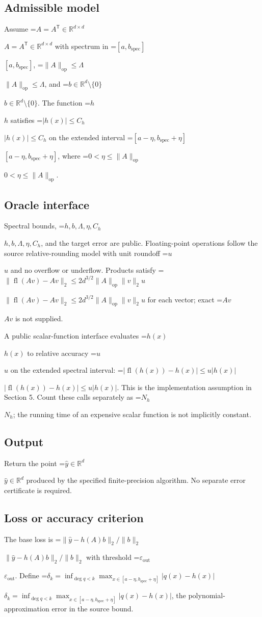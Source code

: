 \documentclass[10pt,a4paper]{article}
\newcommand{\AtlasMath}[1]{\par\begingroup\centering\setbox0=\hbox{$\displaystyle #1$}\ifdim\wd0>1.4\linewidth\typeout{ATLAS WIDE FORMULA: \the\wd0}\fi\ifdim\wd0>\linewidth\resizebox{\linewidth}{!}{\box0}\else\box0\fi\par\endgroup}
\newcommand{\AtlasInlineMath}[1]{\begingroup\setbox0=\hbox{$#1$}\ifdim\wd0>.4\linewidth\endgroup\AtlasMath{#1}\else\endgroup$#1$\fi}
\begin{document}
\subsection{Admissible model}
Assume \AtlasInlineMath{A=A^{\mathsf T}\in\mathbb{R}^{d\times d}} with spectrum in \AtlasInlineMath{[a,b_{\mathrm{spec}}]}, \AtlasInlineMath{\|A\|_{\mathrm{op}}\le\Lambda}, and \AtlasInlineMath{b\in\mathbb{R}^d\setminus\{0\}}. The function \AtlasInlineMath{h} satisfies \AtlasInlineMath{|h(x)|\le C_h} on the extended interval \AtlasInlineMath{[a-\eta,b_{\mathrm{spec}}+\eta]}, where \AtlasInlineMath{0<\eta\le\|A\|_{\mathrm{op}}}.

\subsection{Oracle interface}
Spectral bounds, \AtlasInlineMath{h,b,\Lambda,\eta,C_h}, and the target error are public. Floating-point operations follow the source relative-rounding model with unit roundoff \AtlasInlineMath{u} and no overflow or underflow. Products satisfy \AtlasInlineMath{\|\operatorname{fl}(Av)-Av\|_2\le2d^{3/2}\|A\|_{\mathrm{op}}\|v\|_2u} for each vector; exact \AtlasInlineMath{Av} is not supplied.

A public scalar-function interface evaluates \AtlasInlineMath{h(x)} to relative accuracy \AtlasInlineMath{u} on the extended spectral interval: \AtlasInlineMath{|\operatorname{fl}(h(x))-h(x)|\le u|h(x)|}. This is the implementation assumption in Section 5. Count these calls separately as \AtlasInlineMath{N_h}; the running time of an expensive scalar function is not implicitly constant.

\subsection{Output}
Return the point \AtlasInlineMath{\widehat y\in\mathbb R^d} produced by the specified finite-precision algorithm. No separate error certificate is required.

\subsection{Loss or accuracy criterion}
The base loss is \AtlasInlineMath{\|\widehat{y}-h(A)b\|_2/\|b\|_2} with threshold \AtlasInlineMath{\varepsilon_{\mathrm{out}}}. Define \AtlasInlineMath{\delta_k=\inf_{\deg q<k}\max_{x\in[a-\eta,b_{\mathrm{spec}}+\eta]}|q(x)-h(x)|}, the polynomial-approximation error in the source bound.
\end{document}
